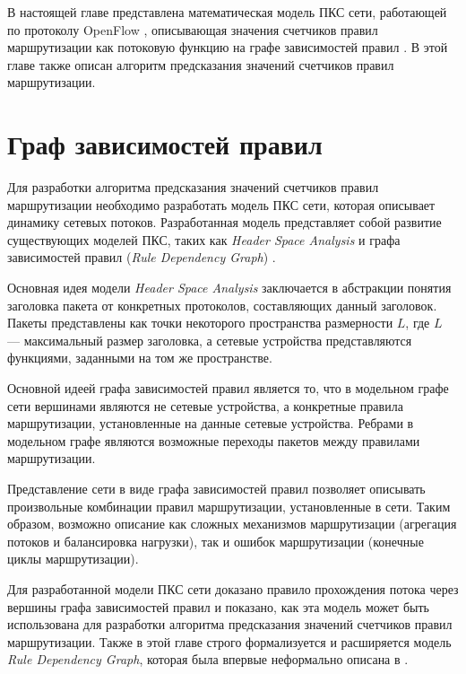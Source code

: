 \documentclass[../thesis.tex]{subfiles}
\begin{document}
В настоящей главе представлена математическая модель ПКС сети, работающей по протоколу OpenFlow \cite{openflow15}, описывающая значения счетчиков правил маршрутизации как потоковую функцию \cite{ford2015flows} на графе зависимостей правил \cite{kazemian2013real}.
В этой главе также описан алгоритм предсказания значений счетчиков правил маршрутизации.

\section{Граф зависимостей правил} \label{section:dependency_graph}

Для разработки алгоритма предсказания значений счетчиков правил маршрутизации необходимо разработать модель ПКС сети, которая описывает динамику сетевых потоков.
Разработанная модель представляет собой развитие существующих моделей ПКС, таких как \textit{Header Space Analysis} \cite{kazemian2012header} и графа зависимостей правил (\textit{Rule Dependency Graph}) \cite{kazemian2013real}. 

Основная идея модели \textit{Header Space Analysis} заключается в абстракции понятия заголовка пакета от конкретных протоколов, составляющих данный заголовок.
Пакеты представлены как точки некоторого пространства размерности $L$, где $L$ --- максимальный размер заголовка, а сетевые устройства представляются функциями, заданными на том же пространстве.

Основной идеей графа зависимостей правил является то, что в модельном графе сети вершинами являются не сетевые устройства, а конкретные правила маршрутизации, установленные на данные сетевые устройства.
Ребрами в модельном графе являются возможные переходы пакетов между правилами маршрутизации.

Представление сети в виде графа зависимостей правил позволяет описывать произвольные комбинации правил маршрутизации, установленные в сети.
Таким образом, возможно описание как сложных механизмов маршрутизации (агрегация потоков и балансировка нагрузки), так и ошибок маршрутизации (конечные циклы маршрутизации).

Для разработанной модели ПКС сети доказано правило прохождения потока через вершины графа зависимостей правил и показано, как эта модель может быть использована для разработки алгоритма предсказания значений счетчиков правил маршрутизации.
Также в этой главе строго формализуется и расширяется модель \textit{Rule Dependency Graph}, которая была впервые неформально описана в \cite{kazemian2013real}.
\\
\end{document}
